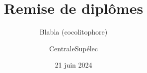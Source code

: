 \documentclass{beamer}
\title[Remise de diplômes]{Remise de diplômes}
\subtitle{Blabla (cocolitophore)}
\author{CentraleSupélec}
\institute{14h - Amphithéâtre Michelin}
\date{21 juin 2024}
\begin{document}
\begin{frame}
  \titlepage
\end{frame}


\end{document}
